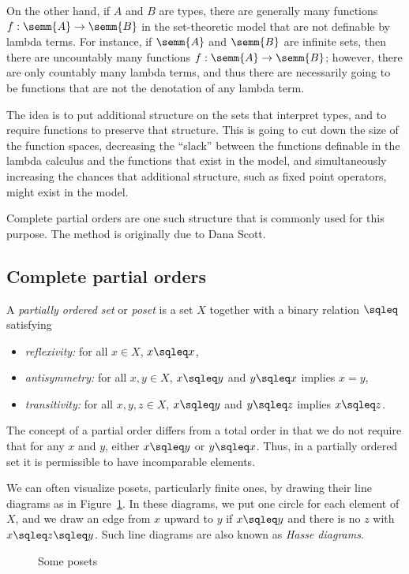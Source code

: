 \documentclass[12pt]{article}
\begin{document}
On the other hand, if $A$ and $B$ are types, there are generally many
functions $f:\semm{A}\to\semm{B}$ in the set-theoretic model that are
not definable by lambda terms. For instance, if $\semm{A}$ and
$\semm{B}$ are infinite sets, then there are uncountably many
functions $f:\semm{A}\to\semm{B}$; however, there are only countably
many lambda terms, and thus there are necessarily going to be
functions that are not the denotation of any lambda term.

The idea is to put additional structure on the sets that interpret
types, and to require functions to preserve that structure. This is
going to cut down the size of the function spaces, decreasing the
``slack'' between the functions definable in the lambda calculus and
the functions that exist in the model, and simultaneously increasing
the chances that additional structure, such as fixed point operators,
might exist in the model.

Complete partial orders are one such structure that is commonly used
for this purpose. The method is originally due to Dana Scott.

\subsection{Complete partial orders}

\begin{definition}
  A {\em partially ordered set} or {\em poset} is a set $X$ together
  with a binary relation $\sqleq$ satisfying
  \begin{itemize}
  \item {\em reflexivity:} for all $x\in X$, $x\sqleq x$,
  \item {\em antisymmetry:} for all $x,y\in X$, $x\sqleq y$ and $y\sqleq
    x$ implies $x=y$,
  \item {\em transitivity:} for all $x,y,z\in X$, $x\sqleq y$ and
    $y\sqleq z$ implies $x\sqleq z$.
  \end{itemize}
\end{definition}

The concept of a partial order differs from a total order in that we
do not require that for any $x$ and $y$, either $x\sqleq y$ or $y\sqleq
x$. Thus, in a partially ordered set it is permissible to have
incomparable elements.

We can often visualize posets, particularly finite ones, by drawing
their line diagrams as in Figure~\ref{fig-posets}. In these diagrams,
we put one circle for each element of $X$, and we draw an edge from
$x$ upward to $y$ if $x\sqleq y$ and there is no $z$ with $x\sqleq
z\sqleq y$. Such line diagrams are also known as {\em Hasse diagrams}.
\begin{figure}
\begin{center}

\end{center}
\caption{Some posets}\label{fig-posets}
\end{figure}
\end{document}
